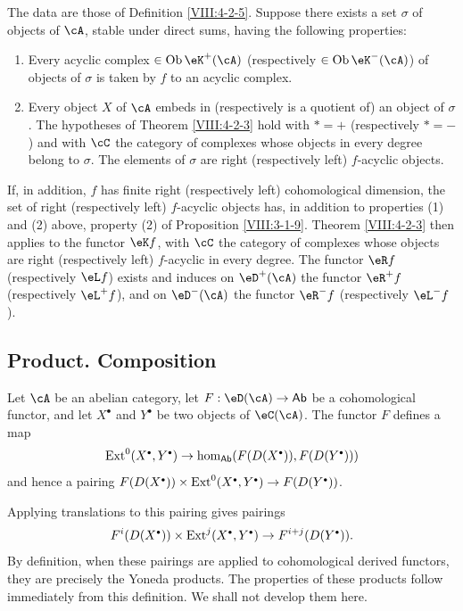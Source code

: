 \begin{corollary}\label{VIII:4-2-3-2} %
The data are those of Definition \ref{VIII:4-2-5}. Suppose there exists a
set $\sigma$ of objects of $\cA$, stable under direct sums, having the
following properties:
\begin{enumerate}
  \item Every acyclic complex
    $\in \operatorname{Ob}{\eK^+(\cA)}$ (respectively
    $\in\operatorname{Ob}{\eK^-(\cA)}$) of objects of $\sigma$ is taken by
    $f$ to an acyclic complex.
  \item Every object $X$ of $\cA$ embeds in (respectively is a quotient of)
    an object of $\sigma$. The hypotheses of Theorem \ref{VIII:4-2-3}
    hold with $\ast=+$ (respectively $\ast=-$) and with $\cC$ the category
    of complexes whose objects in every degree belong to $\sigma$. The
    elements of $\sigma$ are right (respectively left) $f$-acyclic
    objects.
\end{enumerate}

If, in addition, $f$ has finite right (respectively left) cohomological
dimension, the set of right (respectively left) $f$-acyclic objects has,
in addition to properties (1) and (2) above, property (2) of Proposition
\ref{VIII:3-1-9}. Theorem \ref{VIII:4-2-3} then applies to the functor
$\eK f$, with $\cC$ the category of complexes whose objects are right
(respectively left) $f$-acyclic in every degree. The functor $\eR f$
(respectively $\eL f$) exists and induces on $\eD^+(\cA)$ the functor
$\eR^+ f$ (respectively $\eL^+ f$), and on $\eD^-(\cA)$ the functor
$\eR^- f$ (respectively $\eL^- f$).
\end{corollary}

\subsection{Product. Composition}\label{VIII:4-3}

Let $\cA$ be an abelian category, let
$F:\eD(\cA) \to \mathsf{Ab}$ be a cohomological functor, and let
$X^\bullet$ and $Y^\bullet$ be two objects of $\eC(\cA)$. The functor $F$
defines a map
\[
  \ext^0(X^\bullet,Y^\bullet) \to \hom_{\mathsf{Ab}}(F(D(X^\bullet)),F(D(Y^\bullet)))
\]
and hence a pairing
$F(D(X^\bullet))\times \ext^0(X^\bullet,Y^\bullet) \to F(D(Y^\bullet))$.

Applying translations to this pairing gives pairings
\[
  F^i(D(X^\bullet))\times \ext^j(X^\bullet,Y^\bullet) \to F^{i+j}(D(Y^\bullet)) \text{.}
\]
By definition, when these pairings are applied to cohomological derived
functors, they are precisely the Yoneda products. The properties of these
products follow immediately from this definition. We shall not develop
them here.

